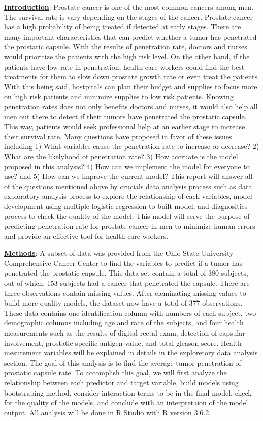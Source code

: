 \documentclass[11pt]{article}\usepackage[]{graphicx}\usepackage[]{color}
\begin{document}
\noindent\textbf{\underline{Introduction}}: Prostate cancer is one of the most common cancers among men. The survival rate is vary depending on the stages of the cancer. Prostate cancer has a high probability of being treated if detected at early stages. There are many important characteristics that can predict whether a tumor has penetrated the prostatic capsule. With the results of penetration rate, doctors and nurses would prioritize the patients with the high risk level. On the other hand, if the patients have low rate in penetration, health care workers could find the best treatments for them to slow down prostate growth rate or even treat the patients. With this being said, hostpitals can plan their budget and supplies to focus more on high risk patients and minimize supplies to low risk patients. Knowing penetration rates does not only benefits doctors and nurses, it would also help all men out there to detect if their tumors have penetrated the prostatic capsule. This way, patients would seek professional help at an earlier stage to increase their survival rate. Many questions have proposed in favor of these issues including 1) What variables cause the penetration rate to increase or decrease? 2) What are the likelyhood of penetration rate? 3) How accruate is the model proposed in this analysis? 4) How can we implement the model for everyone to use? and 5) How can we improve the current model? This report will answer all of the questions mentioned above by crucials data analysis process such as data exploratory analysis process to explore the relationship of each variables, model development using multiple logistic regression to built model, and diagnositics process to check the quality of the model. This model will serve the purpose of predicting penetration rate for prostate cancer in men to minimize human errors and provide an effective tool for health care workers.
\hfill \break

\noindent\textbf{\underline{Methods}}: A subset of data was provided from the Ohio State University Comprehensive Cancer Center to find the variables to predict if a tumor has penetrated the prostatic capsule. This data set contain a total of 380 subjects, out of which, 153 subjects had a cancer that penetrated the capsule. There are three observations contain missing values. After eleminating missing values to build more quality models, the dataset now have a total of 377 observations. These data contains one identification column with numbers of each subject, two demographic columns including age and race of the subjects, and four health measurements such as the results of digital rectal exam, detection of capsular involvement, prostatic specific antigen value, and total gleason score. Health mesurement variables will be explained in details in the exploretory data analysis section. The goal of this analysis is to find the average tumor penetration of prostatic capsule rate. To accomplish this goal, we will first analyze the relationship between each predictor and target variable, build models using bootstraping method, consider interaction terms to be in the final model, check for the quality of the models, and conclude with an interpretaion of the model output. All analysis will be done in R Studio with R version 3.6.2.        
\hfill \break
\end{document}
